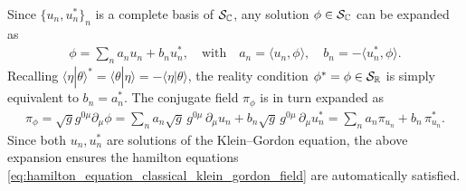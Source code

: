 \documentclass[../QFT_main.tex]{subfiles}
\begin{document}
\begin{mytheorem}
Since $\{u_n, u_n^*\}_n$ is a complete basis of $\mathcal{S}_{\mathbb{C}}$, any solution $\phi\in \mathcal{S}_{\mathbb{C}}$ can be expanded as
\begin{align}\label{eq:expansion_mode_function_phi_classical}
    \phi = \sum_n a_n u_n + b_n u_n^*,\quad \text{with}\quad a_n = \langle u_n, \phi \rangle, \quad b_n = -\langle u_n^*, \phi \rangle. 
\end{align}
Recalling $\langle \eta|\theta\rangle^* = \langle \theta|\eta\rangle = -\langle \eta|\theta\rangle$, the reality condition $\phi^*=\phi\in \mathcal{S}_{\mathbb{R}}$ is simply equivalent to $b_n = a_n^*$.
The conjugate field $\pi_\phi$ is in turn expanded as
\begin{align}\label{eq:expansion_mode_function_pi_classical}
    \pi_\phi = \sqrt{g} g^{0\mu}\partial_\mu \phi = \sum_n a_n \sqrt{g} \,g^{0\mu}\,\partial_\mu u_n + b_n \sqrt{g}\, g^{0\mu}\,\partial_\mu u_n^* = \sum_n a_n \pi_{u_n} + b_n\, \pi_{u_n}^*.
\end{align}
Since both $u_n, u_n^*$ are solutions of the Klein--Gordon equation, the above expansion ensures the hamilton equations \eqref{eq:hamilton_equation_classical_klein_gordon_field} are automatically satisfied.


\end{mytheorem}
\end{document}
